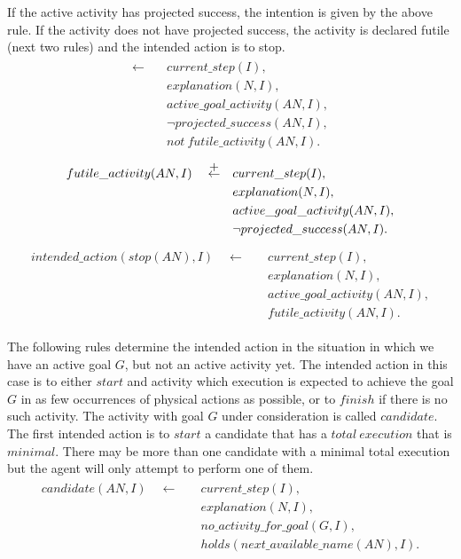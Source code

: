 \documentclass[11pt, oneside]{article}
\begin{document}
If the active activity has projected success, the intention is given by the above rule. If the activity does not have projected success, the activity is declared futile (next two rules) and the intended action is to stop.
\begin{align}\begin{split}
 \leftarrow \quad &current\_step(I),\\
&explanation(N,I),\\
	&active\_goal\_activity(AN,I),\\
	&\neg projected\_success(AN,I),\\
	&not\ futile\_activity(AN,I).
\end{split}\end{align}
\begin{align}\begin{split}
futile\_activity(AN,I)\quad \stackrel{\mathclap{\normalfont\mbox{+}}}{\leftarrow}  \quad  &current\_step(I),\\
&explanation(N,I),\\
	&active\_goal\_activity(AN,I),\\
	&\neg projected\_success(AN,I).
\end{split}\end{align}
\begin{align}\begin{split}
intended\_action(stop(AN),I) \quad \leftarrow  \quad &current\_step(I),\\
&explanation(N,I),\\
	&active\_goal\_activity(AN,I),\\
	&futile\_activity(AN,I).
\end{split}\end{align}

The following rules determine the intended action in the situation in which we have an active goal $G$, but not an active activity yet. The intended action in this case is to either $start$ and activity which execution is expected to achieve the goal $G$ in as few occurrences of physical actions as possible, or to $finish$ if there is no such activity. The activity with goal $G$ under consideration is called $candidate$. The first intended action is to $start$ a candidate that has a $total\ execution$ that is $minimal$. There may be more than one candidate with a minimal total execution but the agent will only attempt to perform one of them.
\begin{align}\begin{split}
candidate(AN,I) \quad \leftarrow \quad &current\_step(I),\\
&explanation(N,I),\\
&no\_activity\_for\_goal(G,I),\\
&holds(next\_available\_name(AN),I).
\end{split}\end{align}
\end{document}
